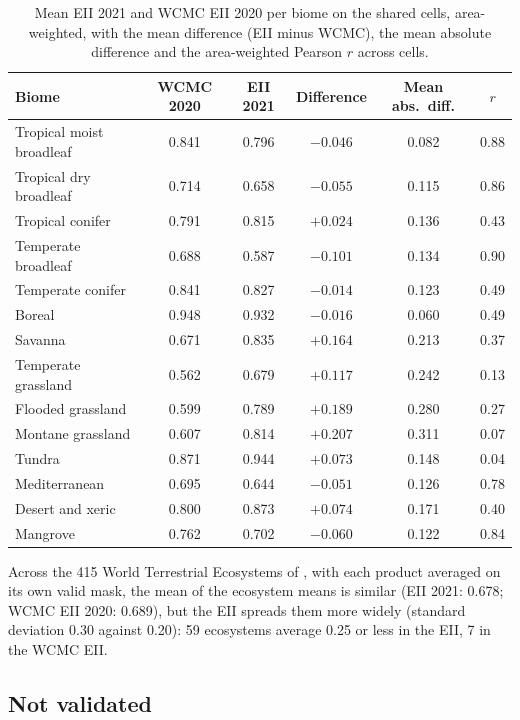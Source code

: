 \documentclass[11pt,a4paper]{article}
\begin{document}
\begin{table}[H]
\centering\small
\caption{Mean EII 2021 and WCMC EII 2020 per biome on the shared cells, area-weighted, with the
mean difference (EII minus WCMC), the mean absolute difference and the area-weighted Pearson $r$
across cells.}
\label{tab:wcmc-biome}
\begin{tabular}{lccccc}
\toprule
Biome & WCMC 2020 & EII 2021 & Difference & Mean abs.\ diff. & $r$ \\
\midrule
Tropical moist broadleaf & 0.841 & 0.796 & $-0.046$ & 0.082 & 0.88 \\
Tropical dry broadleaf & 0.714 & 0.658 & $-0.055$ & 0.115 & 0.86 \\
Tropical conifer & 0.791 & 0.815 & $+0.024$ & 0.136 & 0.43 \\
Temperate broadleaf & 0.688 & 0.587 & $-0.101$ & 0.134 & 0.90 \\
Temperate conifer & 0.841 & 0.827 & $-0.014$ & 0.123 & 0.49 \\
Boreal & 0.948 & 0.932 & $-0.016$ & 0.060 & 0.49 \\
Savanna & 0.671 & 0.835 & $+0.164$ & 0.213 & 0.37 \\
Temperate grassland & 0.562 & 0.679 & $+0.117$ & 0.242 & 0.13 \\
Flooded grassland & 0.599 & 0.789 & $+0.189$ & 0.280 & 0.27 \\
Montane grassland & 0.607 & 0.814 & $+0.207$ & 0.311 & 0.07 \\
Tundra & 0.871 & 0.944 & $+0.073$ & 0.148 & 0.04 \\
Mediterranean & 0.695 & 0.644 & $-0.051$ & 0.126 & 0.78 \\
Desert and xeric & 0.800 & 0.873 & $+0.074$ & 0.171 & 0.40 \\
Mangrove & 0.762 & 0.702 & $-0.060$ & 0.122 & 0.84 \\
\bottomrule
\end{tabular}
\end{table}

Across the 415 World Terrestrial Ecosystems of \citet{sayre2020}, with each product averaged on
its own valid mask, the mean of the ecosystem means is similar (EII 2021: 0.678; WCMC EII 2020:
0.689), but the EII spreads them more widely (standard deviation 0.30 against 0.20): 59
ecosystems average 0.25 or less in the EII, 7 in the WCMC EII.

\subsection{Not validated}
\end{document}
